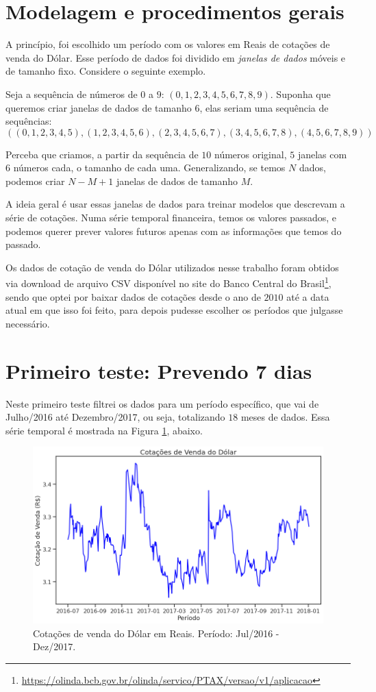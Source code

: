 \section{Modelagem e procedimentos gerais}

A princípio, foi escolhido um período com os valores em Reais de cotações de venda do Dólar. Esse período de dados foi dividido em \emph{janelas de dados} móveis e de tamanho fixo. Considere o seguinte exemplo. 

Seja a sequência de números de $0$ a $9$: $(0,1,2,3,4,5,6,7,8,9)$. Suponha que queremos criar janelas de dados de tamanho $6$, elas seriam uma sequência de sequências:
\[ ((0,1,2,3,4,5),(1,2,3,4,5,6),(2,3,4,5,6,7),(3,4,5,6,7,8),(4,5,6,7,8,9)) \]

Perceba que criamos, a partir da sequência de $10$ números original, $5$ janelas com $6$ números cada, o tamanho de cada uma. Generalizando, se temos $N$ dados, podemos criar $N{-}M{+}1$ janelas de dados de tamanho $M$.

A ideia geral é usar essas janelas de dados para treinar modelos que descrevam a série de cotações. Numa série temporal financeira, temos os valores passados, e podemos querer prever valores futuros apenas com as informações que temos do passado.

Os dados de cotação de venda do Dólar utilizados nesse trabalho foram obtidos via download de arquivo CSV disponível no site do Banco Central do Brasil\footnote{\url{https://olinda.bcb.gov.br/olinda/servico/PTAX/versao/v1/aplicacao}}, sendo que optei por baixar dados de cotações desde o ano de $2010$ até a data atual em que isso foi feito, para depois pudesse escolher os períodos que julgasse necessário.

\section{Primeiro teste: Prevendo 7 dias}

Neste primeiro teste filtrei os dados para um período específico, que vai de Julho/2016 até Dezembro/2017, ou seja, totalizando $18$ meses de dados. Essa série temporal é mostrada na Figura \ref{fig:serie_1}, abaixo.

\begin{figure}[htb]
\centering
\includegraphics[width=14cm]{figuras/serie_1}
\caption{Cotações de venda do Dólar em Reais. Período: Jul/2016 - Dez/2017.}
\label{fig:serie_1}
\end{figure}

